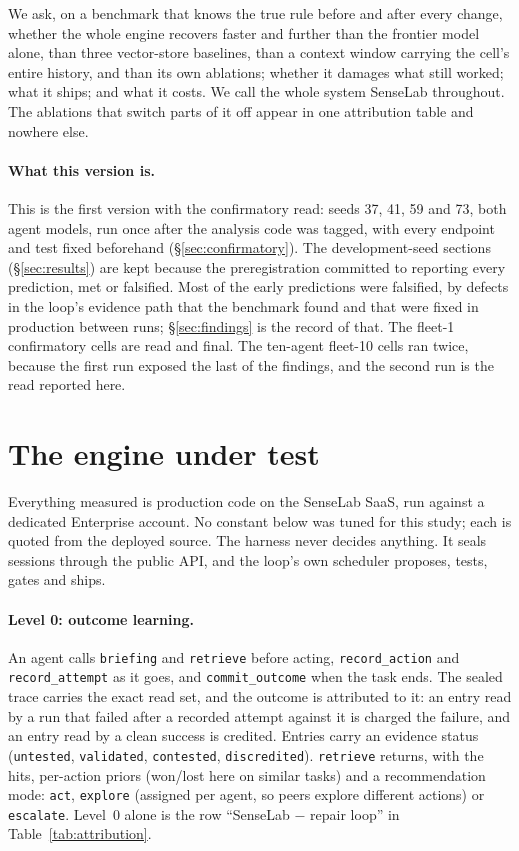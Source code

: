 \documentclass[11pt]{article}
\newcommand{\code}[1]{\texttt{#1}}
\begin{document}
We ask, on a benchmark that knows the true rule before and after every change, whether the whole
engine recovers faster and further than the frontier model alone, than three vector-store
baselines, than a context window carrying the cell's entire history, and than its own
ablations; whether it damages what still worked; what it ships; and what it costs. We call the
whole system SenseLab throughout. The ablations that switch parts of it off appear in one
attribution table and nowhere else.

\paragraph{What this version is.} This is the first version with the confirmatory read: seeds
37, 41, 59 and 73, both agent models, run once after the analysis code was tagged, with every
endpoint and test fixed beforehand (\S\ref{sec:confirmatory}). The development-seed sections
(\S\ref{sec:results}) are kept because the preregistration committed to reporting every
prediction, met or falsified. Most of the early predictions were falsified, by defects in the
loop's evidence path that the benchmark found and that were fixed in production between runs;
\S\ref{sec:findings} is the record of that. The fleet-1 confirmatory cells are read and final.
The ten-agent fleet-10 cells ran twice, because the first run exposed the last of the findings,
and the second run is the read reported here.

\section{The engine under test}
\label{sec:engine}

Everything measured is production code on the SenseLab SaaS, run against a dedicated Enterprise
account. No constant below was tuned for this study; each is quoted from the deployed source.
The harness never decides anything. It seals sessions through the public API, and the loop's own
scheduler proposes, tests, gates and ships.

\paragraph{Level 0: outcome learning.} An agent calls \code{briefing} and \code{retrieve}
before acting, \code{record\_action} and \code{record\_attempt} as it goes, and
\code{commit\_outcome} when the task ends. The sealed trace carries the exact read set, and the
outcome is attributed to it: an entry read by a run that failed after a recorded attempt against
it is charged the failure, and an entry read by a clean success is credited. Entries carry an
evidence status (\code{untested}, \code{validated}, \code{contested}, \code{discredited}).
\code{retrieve} returns, with the hits, per-action priors (won/lost here on similar tasks) and a
recommendation mode: \code{act}, \code{explore} (assigned per agent, so peers explore different
actions) or \code{escalate}. Level~0 alone is the row ``SenseLab $-$ repair loop'' in
Table~\ref{tab:attribution}.
\end{document}
